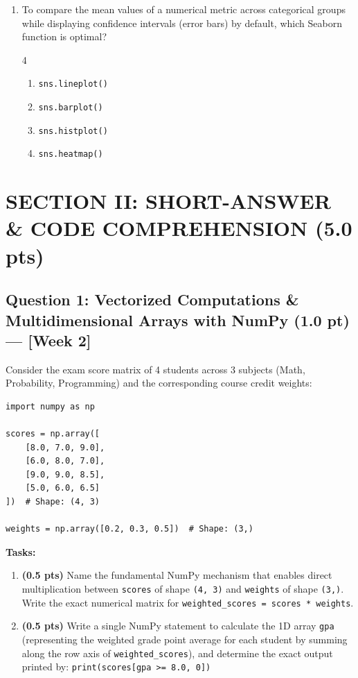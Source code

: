 \documentclass[11pt,a4paper]{article}
\begin{document}
\begin{enumerate}[leftmargin=*,itemsep=2.5pt,resume]
\item To compare the mean values of a numerical metric across categorical groups while displaying confidence intervals (error bars) by default, which Seaborn function is optimal?
\begin{multicols}{4}
\begin{enumerate}[label=\Alph*.]
  \item \texttt{sns.lineplot()}
  \item \texttt{sns.barplot()}
  \item \texttt{sns.histplot()}
  \item \texttt{sns.heatmap()}
\end{enumerate}
\end{multicols}

\end{enumerate}

\newpage
\section*{SECTION II: SHORT-ANSWER \& CODE COMPREHENSION (5.0 pts)}

\subsection*{Question 1: Vectorized Computations \& Multidimensional Arrays with NumPy (1.0 pt) --- [Week 2]}
Consider the exam score matrix of 4 students across 3 subjects (Math, Probability, Programming) and the corresponding course credit weights:
\begin{lstlisting}
import numpy as np

scores = np.array([
    [8.0, 7.0, 9.0],
    [6.0, 8.0, 7.0],
    [9.0, 9.0, 8.5],
    [5.0, 6.0, 6.5]
])  # Shape: (4, 3)

weights = np.array([0.2, 0.3, 0.5])  # Shape: (3,)
\end{lstlisting}

\noindent
\textbf{Tasks:}
\begin{enumerate}[label=\textbf{\alph*)}]
  \item \textbf{(0.5 pts)} Name the fundamental NumPy mechanism that enables direct multiplication between \texttt{scores} of shape \texttt{(4, 3)} and \texttt{weights} of shape \texttt{(3,)}. Write the exact numerical matrix for \texttt{weighted\_scores = scores * weights}.
  \item \textbf{(0.5 pts)} Write a single NumPy statement to calculate the 1D array \texttt{gpa} (representing the weighted grade point average for each student by summing along the row axis of \texttt{weighted\_scores}), and determine the exact output printed by: \quad \texttt{print(scores[gpa >= 8.0, 0])}
\end{enumerate}
\end{document}
